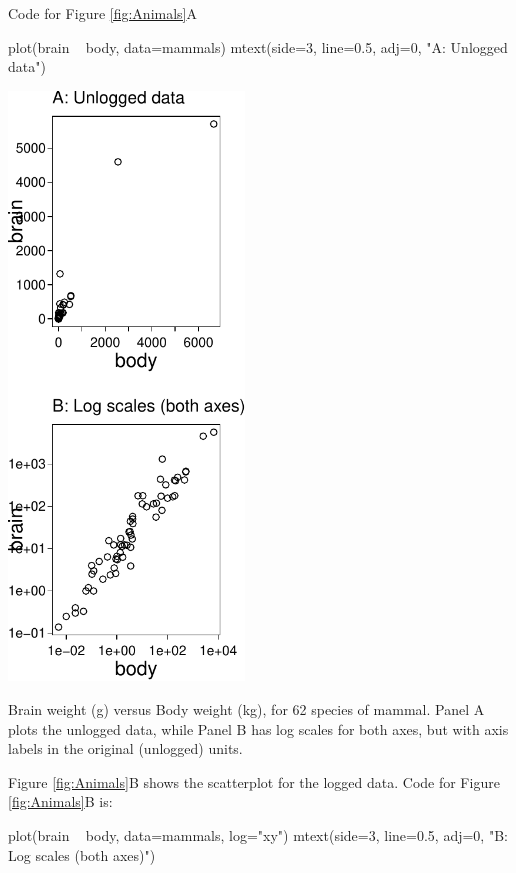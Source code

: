 Code for Figure \ref{fig:Animals}A
\begin{Schunk}
\begin{Sinput}
plot(brain ~ body, data=mammals)
mtext(side=3, line=0.5, adj=0, "A: Unlogged data")
\end{Sinput}
\end{Schunk}

\begin{marginfigure}
\begin{Schunk}


\centerline{\includegraphics[width=0.47\textwidth]{figs/05-bbAB-1} }

\end{Schunk}
\caption{Brain weight (g) versus Body weight (kg), for 62 species of mammal.
Panel A plots the unlogged data, while Panel B has log scales for
both axes, but with axis labels in the original (unlogged) units.
  \label{fig:Animals}}
\end{marginfigure}

Figure \ref{fig:Animals}B shows the scatterplot for the logged data.
Code for Figure \ref{fig:Animals}B is:
\begin{Schunk}
\begin{Sinput}
plot(brain ~ body, data=mammals, log="xy")
mtext(side=3, line=0.5, adj=0,
      "B: Log scales (both axes)")
\end{Sinput}
\end{Schunk}

